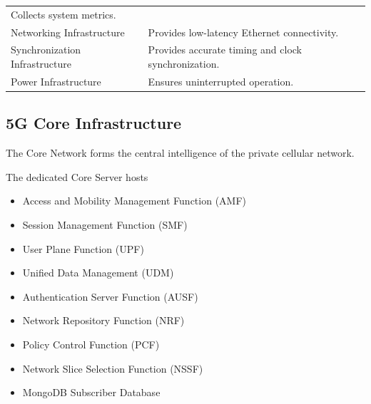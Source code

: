 \documentclass[12pt,a4paper]{article}\usepackage[a4paper,margin=1in]{geometry}\usepackage{graphicx}\usepackage{longtable}\usepackage{booktabs}\usepackage{hyperref}\usepackage{enumitem}\usepackage{amsmath}\usepackage{tikz}\usepackage{pgfgantt}\usepackage{setspace}\setstretch{1.15}\usetikzlibrary{positioning,arrows.meta,shapes.geometric}
\begin{document}
\begin{table}[h]
\begin{tabular}{p{5cm}p{9cm}}
			Collects system metrics.
			
			\\
			
			Networking Infrastructure
			
			&
			
			Provides low-latency Ethernet connectivity.
			
			\\
			
			Synchronization Infrastructure
			
			&
			
			Provides accurate timing and clock synchronization.
			
			\\
			
			Power Infrastructure
			
			&
			
			Ensures uninterrupted operation.
			
			\\
			
			\bottomrule
			
		\end{tabular}
		
	\end{table}
	
	
	\subsection{5G Core Infrastructure}
	
	The Core Network forms the central intelligence of the private cellular network.
	
	The dedicated Core Server hosts
	
	\begin{itemize}
		
		\item Access and Mobility Management Function (AMF)
		
		\item Session Management Function (SMF)
		
		\item User Plane Function (UPF)
		
		\item Unified Data Management (UDM)
		
		\item Authentication Server Function (AUSF)
		
		\item Network Repository Function (NRF)
		
		\item Policy Control Function (PCF)
		
		\item Network Slice Selection Function (NSSF)
		
		\item MongoDB Subscriber Database
		
	\end{itemize}
	
\end{document}
